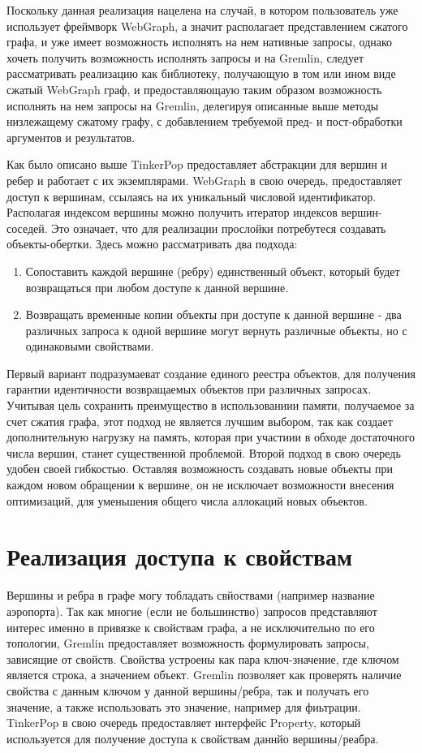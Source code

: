 \documentclass[times,specification,annotation]{itmo-student-thesis}
\begin{document}
Поскольку данная реализация нацелена на случай, в котором пользователь уже использует фреймворк WebGraph, а значит располагает представлением сжатого графа, и уже имеет возможность исполнять на нем нативные запросы, однако хочеть получить возможность исполнять запросы и на Gremlin, следует рассматривать реализацию как библиотеку, получающую в том или ином виде сжатый WebGraph граф, и предоставляющаую таким образом возможность исполнять на нем запросы на Gremlin, делегируя описанные выше методы низлежащему сжатому графу, с добавлением требуемой пред- и пост-обработки аргументов и результатов.

Как было описано выше TinkerPop предоставляет абстракции для вершин и ребер и работает с их экземплярами. WebGraph в свою очередь, предоставляет доступ к вершинам, ссылаясь на их уникальный числовой идентификатор. Располагая индексом вершины можно получить итератор индексов вершин-соседей. Это означает, что для реализации прослойки потребутеся создавать объекты-обертки. Здесь можно рассматривать два подхода:
\begin{enumerate}
    \item Сопоставить каждой вершине (ребру) единственный объект, который будет возвращаться при любом доступе к данной вершине.
    \item Возвращать временные копии объекты при доступе к данной вершине - два различных запроса к одной вершине могут вернуть различные объекты, но с одинаковыми свойствами.
\end{enumerate}

Первый вариант подразумаеват создание единого реестра объектов, для получения гарантии идентичности возвращаемых объектов при различных запросах. Учитывая цель сохранить преимущество в использованиии памяти, получаемое за счет сжатия графа, этот подход не является лучшим выбором, так как создает дополнительную нагрузку на память, которая при участиии в обходе достаточного числа вершин, станет существенной проблемой.
Второй подход в свою очередь удобен своей гибкостью. Оставляя возможность создавать новые объекты при каждом новом обращении к вершине, он не исключает возможности внесения оптимизаций, для уменьшения общего числа аллокаций новых объектов.

\section{Реализация доступа к свойствам}

Вершины и ребра в графе могу тобладать свйоствами (например название аэропорта). Так как многие (если не большинство) запросов представляют интерес именно в привязке к свойствам графа, а не исключительно по его топологии, Gremlin предоставляет возможность формулировать запросы, зависящие от свойств. Свойства устроены как пара ключ-значение, где ключом является строка, а значением объект. Gremlin позволяет как проверять наличие свойства с данным ключом у данной вершины/ребра, так и получать его значение, а также использовать это значение, например для фиьтрации. TinkerPop в свою очередь предоставляет интерфейс Property, который используется для получение доступа к свойствам даннйо вершины/реабра.
\end{document}

